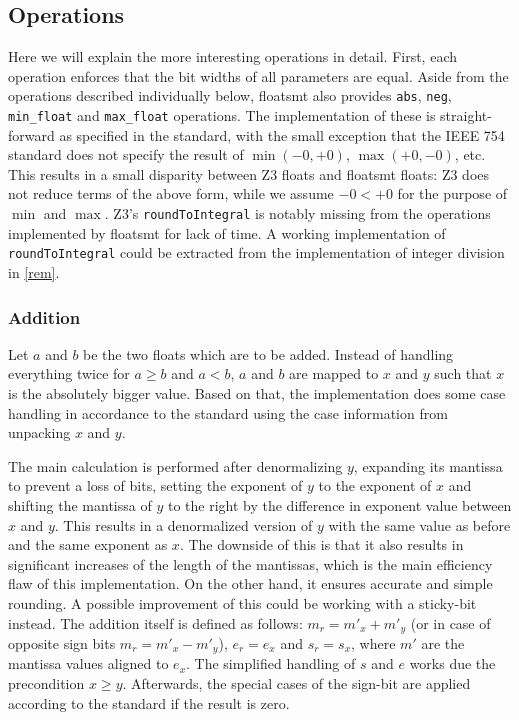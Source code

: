 \documentclass[a4paper,UKenglish,cleveref, autoref, thm-restate]{lipics-v2019}
\begin{document}
\subsection{Operations}
Here we will explain the more interesting operations in detail. First, each operation enforces that the bit widths of all parameters are equal. Aside from the operations described individually below, floatsmt also provides \verb|abs|, \verb|neg|, \verb|min_float| and \verb|max_float| operations. The implementation of these is straight-forward as specified in the standard, with the small exception that the IEEE 754 standard does not specify the result of $\min(-0, +0)$, $\max(+0, -0)$, etc. This results in a small disparity between Z3 floats and floatsmt floats: Z3 does not reduce terms of the above form, while we assume $-0 < +0$ for the purpose of $\min$ and $\max$. Z3's \verb|roundToIntegral| is notably missing from the operations implemented by floatsmt for lack of time. A working implementation of \verb|roundToIntegral| could be extracted from the implementation of integer division in \cref{rem}.

\subsubsection{Addition}
Let $a$ and $b$ be the two floats which are to be added. Instead of handling everything twice for $a\geq b$ and $a<b$, $a$ and $b$ are mapped to $x$ and $y$ such that $x$ is the absolutely bigger value. Based on that, the implementation does some case handling in accordance to the standard using the case information from unpacking $x$ and $y$.

The main calculation is performed after denormalizing $y$, expanding its mantissa to prevent a loss of bits, setting the exponent of $y$ to the exponent of $x$ and shifting the mantissa of $y$ to the right by the difference in exponent value between $x$ and $y$. This results in a denormalized version of $y$ with the same value as before and the same exponent as $x$. The downside of this is that it also results in significant increases of the length of the mantissas, which is the main efficiency flaw of this implementation. On the other hand, it ensures accurate and simple rounding. A possible improvement of this could be working with a sticky-bit instead. The addition itself is defined as follows: $m_r = m'_x + m'_y$ (or in case of opposite sign bits $m_r = m'_x - m'_y$), $e_r = e_x$ and $s_r = s_x$, where $m'$ are the mantissa values aligned to $e_x$. The simplified handling of $s$ and $e$ works due the 
precondition $x \geq y$. Afterwards, the special cases of the sign-bit are applied according to the standard if the result is zero.
\end{document}
